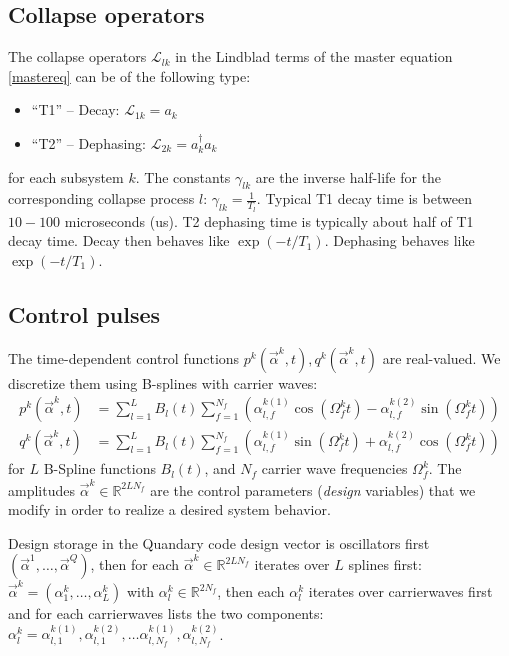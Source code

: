 \documentclass[letterpaper]{article}
\newcommand{\Ell}{\mathcal{L}}
\newcommand{\R}{\mathds{R}}
\begin{document}
\subsection{Collapse operators}
The collapse operators $\Ell_{lk}$ in the Lindblad terms of the master equation \eqref{mastereq} can be of the following type:
\begin{itemize}
  \item ``T1'' -- Decay: $\Ell_{1k} = a_k$
  \item ``T2'' -- Dephasing: $\Ell_{2k} = a_k^{\dagger}a_k$
\end{itemize}
for each subsystem $k$. The constants $\gamma_{lk}$ are the inverse half-life for the corresponding collapse process $l$: $\gamma_{lk} = {\frac{1}{T_l}}$. Typical T1 decay time is between $10-100$ microseconds (us). T2 dephasing time is typically about half of T1 decay time. Decay then behaves like $\exp(-t/{T_1})$. Dephasing behaves like $\exp(- t / T_1)$.

\subsection{Control pulses}
The time-dependent control functions $p^k(\vec{\alpha}^k,t), q^k(\vec{\alpha}^k,t)$ are real-valued. We discretize them using B-splines with carrier waves:
\begin{align}
  p^k(\vec{\alpha}^k,t) &= \sum_{l=1}^L B_l(t) \sum_{f=1}^{N_f} \left(\alpha^{k (1)}_{l,f} \cos(\Omega_f^k t) - \alpha^{k (2)}_{l,f} \sin(\Omega_f^k t) \right) \\
  q^k(\vec{\alpha}^k,t) &= \sum_{l=1}^L B_l(t) \sum_{f=1}^{N_f} \left( \alpha^{k (1)}_{l,f} \sin(\Omega_f^k t) + \alpha^{k (2)}_{l,f} \cos(\Omega_f^k t) \right)
\end{align}
for $L$ B-Spline functions $B_l(t)$, and $N_f$ carrier wave frequencies $\Omega_f^k$. The amplitudes $\vec{\alpha}^k \in \R^{2LN_f}$ are the control parameters (\textit{design} variables) that we modify in order to realize a desired system behavior. 

Design storage in the Quandary code design vector is oscillators first $(\vec{\alpha}^1, \dots, \vec{\alpha}^Q)$, then for each $\vec{\alpha}^k \in \R^{2LN_f}$ iterates over $L$ splines first: $\vec{\alpha}^k = (\alpha^k_1,\dots, \alpha^k_{L})$ with $\alpha^k_l \in \R^{2N_f}$, then each $\alpha^k_l$ iterates over carrierwaves first and for each carrierwaves lists the two components: $\alpha^k_l = \alpha^{k(1)}_{l,1}, \alpha^{k(2)}_{l,1}, \dots \alpha^{k(1)}_{l,N_f}, \alpha^{k(2)}_{l,N_f}$.
\end{document}
